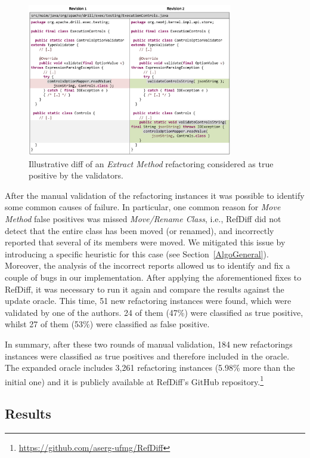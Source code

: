 \begin{figure}[htb]
\centering
\includegraphics[width=0.8\textwidth]{img/diff3.pdf}
\caption{Illustrative diff of an \emph{Extract Method} refactoring considered as true positive by the validators.}
\label{FigDiff3}
\end{figure}

After the manual validation of the refactoring instances it was possible to identify some common causes of failure.
In particular, one common reason for \emph{Move Method} false positives was missed \emph{Move/Rename Class}, i.e., RefDiff did not detect that the entire class has been moved (or renamed), and incorrectly reported that several of its members were moved.
We mitigated this issue by introducing a specific heuristic for this case (see Section~\ref{AlgoGeneral}).
Moreover, the analysis of the incorrect reports allowed us to identify and fix a couple of bugs in our implementation.
After applying the aforementioned fixes to RefDiff, it was necessary to run it again and compare the results against the update oracle. This time, 51 new refactoring instances were found, which were  validated by one of the authors. 24 of them (47\%) were classified as true positive, whilst 27 of them (53\%) were classified as false positive.

In summary, after these two rounds of manual validation, 184 new refactorings instances were classified as true positives and therefore included in the oracle.
The expanded oracle includes 3,261 refactoring instances (5.98\% more than the initial one) and it is publicly available at RefDiff's GitHub repository.\footnote{\url{https://github.com/aserg-ufmg/RefDiff}}

\subsection{Results}
\label{sec:eval:java:results}

